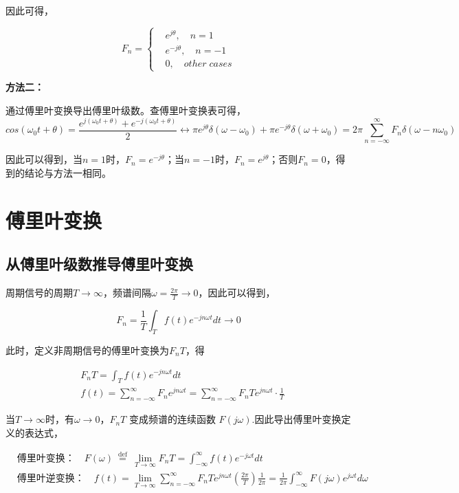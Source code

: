\documentclass[UTF8]{article}
\theoremstyle{definition}
\begin{document}
因此可得，

\begin{equation*}
F_n = \begin{cases}
& e^{j\theta},\quad n = 1\\
& e^{-j\theta},\quad n = -1\\
& 0, \quad other\;cases
\end{cases}
\end{equation*}

\noindent\textbf{方法二：}

通过傅里叶变换导出傅里叶级数。查傅里叶变换表可得，
\begin{equation*}
cos(\omega_0t+\theta)  =\frac{e^{j(\omega_0t+\theta)}+e^{-j(\omega_0t+\theta)}}{2} \leftrightarrow \pi e^{j\theta}\delta(\omega-\omega_0)+\pi e^{-j\theta}\delta(\omega+\omega_0) = 2\pi\sum_{n=-\infty}^{\infty}F_n\delta(\omega-n\omega_0)
\end{equation*}

因此可以得到，当$n=1$时，$F_n=e^{-j\theta}$；当$n=-1$时，$F_n=e^{j\theta}$；否则$F_n=0$，得到的结论与方法一相同。

\section{傅里叶变换}
\subsection{从傅里叶级数推导傅里叶变换}
周期信号的周期$T\to \infty$，频谱间隔$\omega=\frac{2\pi}{T} \to 0$，因此可以得到，

\begin{equation*}
F_n = \frac{1}{T} \int_T f(t)e^{-jn\omega t}dt \to 0
\end{equation*}

此时，定义非周期信号的傅里叶变换为$F_nT$，得

\begin{equation*}
\begin{aligned}
&F_nT = \int_T f(t)e^{-jn\omega t}dt \\
&f(t) = \sum_{n= -\infty}^{\infty} F_ne^{jn\omega t} =
\sum_{n = -\infty}^{\infty}F_n T e^{jn\omega t} \cdot \frac{1}{T}
\end{aligned}
\end{equation*}

当$T \to \infty$时，有$\omega \to 0 $，$F_n T$ 变成频谱的连续函数 $F(j \omega)$.因此导出傅里叶变换定义的表达式，

\begin{equation*}
\begin{aligned}
&\textbf{傅里叶变换：}\quad
F(\omega) \stackrel{\text { def }}{=} \lim _{T \rightarrow \infty} F_n T=\int_{-\infty}^\infty f(t) e^{-j \omega t} d t\\
&\textbf{傅里叶逆变换：}\quad
f(t)=\lim _{T \rightarrow \infty} \sum_{n=-\infty}^{\infty} F_n T e^{j n \omega t}\left(\frac{2 \pi}{T}\right) \frac{1}{2 \pi}=\frac{1}{2 \pi} \int_{-\infty}^{\infty} F(j \omega) e^{j \omega t} d \omega
\end{aligned}
\end{equation*}
\end{document}
